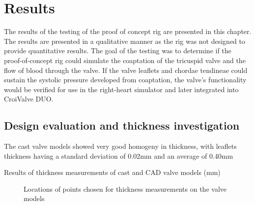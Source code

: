 \chapter{Results}\label{ch:results}
The results of the testing of the proof of concept rig are presented in this chapter. The results are presented in a qualitative manner as the rig was not designed to provide quantitative results.
The goal of the testing was to determine if the proof-of-concept rig could simulate the coaptation of the tricuspid valve and the flow of blood through the valve. If the valve leaflets and chordae tendineae could sustain the systolic pressure developed from coaptation, the valve's functionality would be verified for use in the right-heart simulator and later integrated into CroiValve DUO.
\section{Design evaluation and thickness investigation}
The cast valve models showed very good homogeny in thickness, with leaflets thickness having a standard deviation of 0.02mm and an average of 0.40mm

\begin{table}[H]
    \begin{fullwidth}
        \centering
        \footnotesize
        \noindent\makebox[\textwidth]{%
            }
        \caption{Results of thickness measurements of cast and CAD valve models (mm)}
    \end{fullwidth}
\end{table}

\begin{figure}
    \begin{fullwidth}
        \centering
        \quad
        \quad
        \caption{Locations of points chosen for thickness measurements on the valve models}
        \label{fig:thicky}
    \end{fullwidth}
\end{figure}
